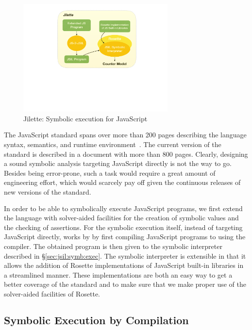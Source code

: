 \begin{figure}[t]
\centering
\includegraphics[width=0.7\textwidth]{figures/jilette.pdf}
\caption{Jilette: Symbolic execution for JavaScript}
\label{fig:jilette:diagram}
\end{figure}

The JavaScript standard spans over more than 200 pages describing the language syntax, semantics, 
and runtime environment~\cite{ecma}. The current version of the standard is described in a document with 
more than 800 pages. Clearly, designing a sound symbolic analysis targeting JavaScript directly 
is not the way to go. Besides being error-prone, such a task would require a great amount of engineering effort, 
which would scarcely pay off given the continuous releases of new versions of the standard. 

In order to be able to symbolically execute JavaScript programs, we first extend the language 
with solver-aided facilities for the creation of symbolic values and the checking of assertions. 
For the symbolic execution itself, instead of targeting JavaScript directly, \jilette works by by first 
compiling JavaScript programs to \jsil using the \JSComp compiler.
The obtained \jsil program is then given to the \jsil symbolic interpreter described in \S\ref{sec:jsil:symb:exec}. 
The symbolic interpreter is extensible in that it allows the addition of Rosette implementations of 
JavaScript built-in libraries in a streamlined manner.  
These implementations are both an easy way to get a better coverage of the standard and 
to make sure that we make proper use of the solver-aided facilities of Rosette.    

\subsection{Symbolic Execution by Compilation} 

